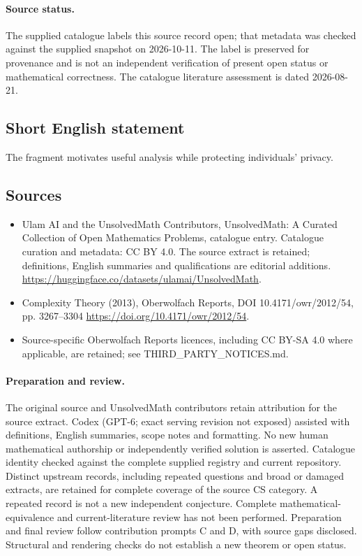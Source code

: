 \documentclass[11pt]{article}
\begin{document}
\paragraph{Source status.}
The supplied catalogue labels this source record open; that metadata was checked against the supplied snapshot on 2026-10-11. The label is preserved for provenance and is not an independent verification of present open status or mathematical correctness. The catalogue literature assessment is dated 2026-08-21.
\subsection{Short English statement}
The fragment motivates useful analysis while protecting individuals' privacy.
\subsection{Sources}
\begin{itemize}
\item[\hypertarget{source:statement:1}{S1}] Ulam AI and the UnsolvedMath Contributors, UnsolvedMath: A Curated Collection of Open Mathematics Problems, catalogue entry. Catalogue curation and metadata: CC BY 4.0. The source extract is retained; definitions, English summaries and qualifications are editorial additions.
\url{https://huggingface.co/datasets/ulamai/UnsolvedMath}.
\item[\hypertarget{source:statement:2}{S2}] Complexity Theory (2013), Oberwolfach Reports, DOI 10.4171/owr/2012/54, pp. 3267--3304
\url{https://doi.org/10.4171/owr/2012/54}.
\item Source-specific Oberwolfach Reports licences, including CC BY-SA 4.0 where applicable, are retained; see THIRD\_PARTY\_NOTICES.md.
\end{itemize}
\paragraph{Preparation and review.}
The original source and UnsolvedMath contributors retain attribution for the source extract. Codex (GPT-6; exact serving revision not exposed) assisted with definitions, English summaries, scope notes and formatting. No new human mathematical authorship or independently verified solution is asserted. Catalogue identity checked against the complete supplied registry and current repository. Distinct upstream records, including repeated questions and broad or damaged extracts, are retained for complete coverage of the source CS category. A repeated record is not a new independent conjecture. Complete mathematical-equivalence and current-literature review has not been performed. Preparation and final review follow contribution prompts C and D, with source gaps disclosed. Structural and rendering checks do not establish a new theorem or open status.
\label{end:statement}
\end{document}
